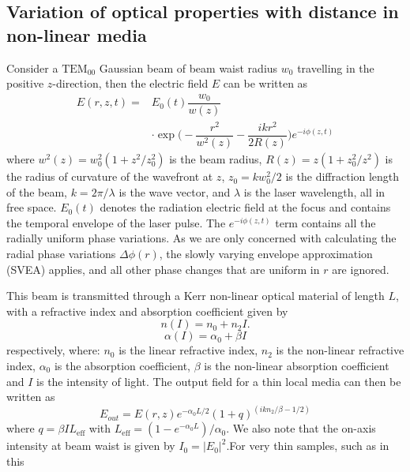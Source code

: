\documentclass[%
 reprint,
 amsmath,amssymb,
 aps,
]{revtex4-2}
\begin{document}
	\subsection{Variation of optical properties with distance in non-linear media}\label{sec:der}
		Consider a $ \mathrm{TEM}_{00} $ Gaussian beam of beam waist radius $ w_0 $ travelling in the positive $ z $-direction, then the electric field $ E $ can be written as
		\begin{equation}\label{key}
			\begin{split}
				E (r, z, t) =& E_0 (t) \dfrac{w_0}{w(z)} \\
				& \cdot \exp \Bigg( -\dfrac{r^2}{w^2(z)} - \dfrac{ikr^2}{2 R(z)} \Bigg) e^{-i \phi (z, t)}
			\end{split}
		\end{equation}
		where $ w^2 (z) = w^2_0 (1 + z^2/z^2_0) $ is the beam radius, $ R(z) = z(1+z_0^2/z^2)$ is the radius of curvature of the wavefront at $ z $, $ z_0 = kw^2_0/2$ is the diffraction length of the beam, $ k = 2\pi/ \lambda $ is the wave vector, and $ \lambda $ is the laser wavelength, all in free space. $ E_0(t) $ denotes the radiation electric field at the focus and contains the temporal envelope of the laser pulse. The $ e^{-i \phi (z, t)} $ term contains all the radially uniform phase variations. As we are only concerned with calculating the radial phase variations $ \Delta \phi (r) $, the slowly varying envelope approximation (SVEA) applies, and all other phase changes that are uniform in $ r $ are ignored.
		\par 
		This beam is transmitted through a Kerr non-linear optical material of length $ L $, with a refractive index and absorption coefficient given by
		\begin{equation}\label{key}
			n(I) = n_0 + n_2 I.
		\end{equation}
		\begin{equation}\label{key}
			\alpha(I) = \alpha_0 + \beta I
		\end{equation}
		respectively, where: $ n_0 $ is the linear refractive index, $ n_2 $ is the non-linear refractive index, $ \alpha_0 $ is the absorption coefficient, $ \beta $ is the non-linear absorption coefficient and $ I $ is the intensity of light. The output field for a thin local media can then be written as
		\begin{equation}\label{eq:12}
			E_{out} = E(r, z)  e^{-\alpha_0 L/2} (1+q)^{(ikn_2/\beta - 1/2)}
		\end{equation}
		where $ q = \beta I L_{\mathrm{eff}} $ with $ L_{\mathrm{eff}} = (1-e^{-\alpha_0L})/\alpha_0 $. We also note that the on-axis intensity at beam waist is given by $ I_0 = |E_0|^2 $.For very thin samples, such as in this
\end{document}
